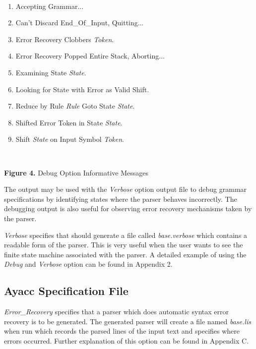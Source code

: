 \hspace{-0.05in}\hrulefill\hspace{0.0in}\\
\vspace{-0.2in}
{\bf
\begin{enumerate}
\item Accepting Grammar...
\item Can't Discard End\_Of\_Input, Quitting...
\item Error Recovery Clobbers {\it Token}.
\item Error Recovery Popped Entire Stack, Aborting...
\item Examining State {\it State}.
\item Looking for State with Error as Valid Shift.
\item Reduce by Rule {\it Rule} Goto State {\it State}.
\item Shifted Error Token in State {\it State}.
\item Shift {\it State} on Input Symbol {\it Token}.
\end{enumerate}
}
\hspace{-0.05in}\hrulefill\hspace{0.0in}\\
\centerline{{\bf Figure 4.} Debug Option Informative Messages}
The output may be used with the {\it Verbose} option
output file to debug grammar specifications by identifying states
where the parser behaves incorrectly.  The debugging output
is also useful for observing error recovery mechanisms taken by the
parser.

{\it Verbose} specifies that \ayacc should generate a file called
{\it base.verbose}
which contains a readable form of the parser.  This is very useful when
the user wants to see the finite state machine associated with the
parser.  A detailed example of using the {\it Debug} and {\it Verbose}
option can be found in Appendix 2.
\subsection{Ayacc Specification File}

{\it Error\_Recovery} specifies that a parser which does automatic
syntax error recovery is to be generated.  The generated parser will
create a file named {\it base.lis} when run which records the parsed
lines of the input text and specifies where errors occurred.  Further
explanation of this option can be found in Appendix C.

